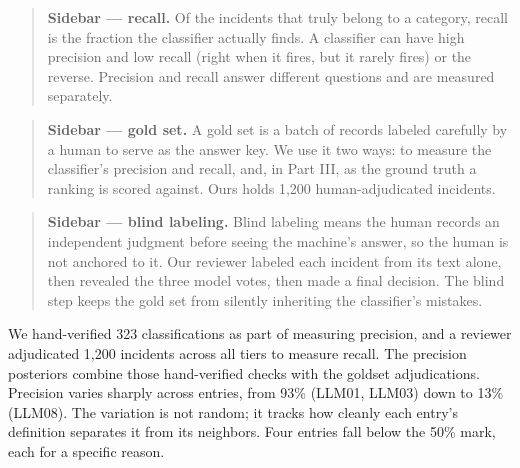 \documentclass[11pt]{article}
\begin{document}
\begin{quote}
\textbf{Sidebar --- recall.} Of the incidents that truly belong to a
category, recall is the fraction the classifier actually finds. A
classifier can have high precision and low recall (right when it fires,
but it rarely fires) or the reverse. Precision and recall answer
different questions and are measured separately.
\end{quote}

\begin{quote}
\textbf{Sidebar --- gold set.} A gold set is a batch of records labeled
carefully by a human to serve as the answer key. We use it two ways: to
measure the classifier's precision and recall, and, in Part III, as the
ground truth a ranking is scored against. Ours holds 1,200
human-adjudicated incidents.
\end{quote}

\begin{quote}
\textbf{Sidebar --- blind labeling.} Blind labeling means the human
records an independent judgment before seeing the machine's answer, so
the human is not anchored to it. Our reviewer labeled each incident from
its text alone, then revealed the three model votes, then made a final
decision. The blind step keeps the gold set from silently inheriting the
classifier's mistakes.
\end{quote}

We hand-verified 323 classifications as part of measuring precision, and
a reviewer adjudicated 1,200 incidents across all tiers to measure
recall. The precision posteriors combine those hand-verified checks with
the goldset adjudications. Precision varies sharply across entries, from
93\% (LLM01, LLM03) down to 13\% (LLM08). The variation is not random;
it tracks how cleanly each entry's definition separates it from its
neighbors. Four entries fall below the 50\% mark, each for a specific
reason.
\end{document}
